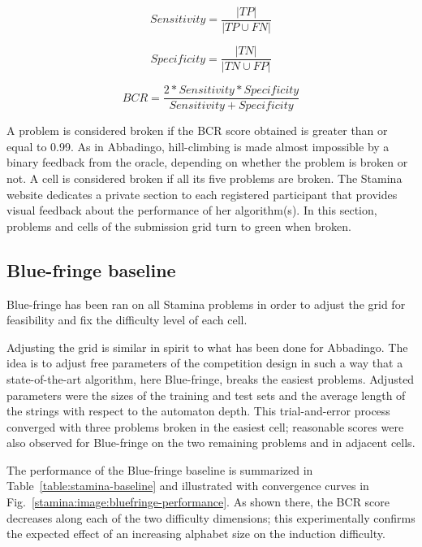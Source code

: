 $$Sensitivity=\frac{|TP|}{|TP \cup FN|}$$ 

$$Specificity=\frac{|TN|}{|TN \cup FP|}$$

$$BCR=\frac{2*Sensitivity*Specificity}{Sensitivity + Specificity}$$

A problem is considered broken if the BCR score obtained is greater than or equal to 0.99. As in Abbadingo, hill-climbing is made almost impossible by a binary feedback from the oracle, depending on whether the problem is broken or not. A cell is considered broken if all its five problems are broken. The Stamina website dedicates a private section to each registered participant that provides visual feedback about the performance of her algorithm(s). In this section, problems and cells of the submission grid turn to green when broken.

\subsection{Blue-fringe baseline\label{subsection:stamina-baseline}}

Blue-fringe has been ran on all Stamina problems in order to adjust the grid for feasibility and fix the difficulty level of each cell.

Adjusting the grid is similar in spirit to what has been done for Abbadingo. The idea is to adjust free parameters of the competition design in such a way that a state-of-the-art algorithm, here Blue-fringe, breaks the easiest problems. Adjusted parameters were the sizes of the training and test sets and the average length of the strings with respect to the automaton depth. This trial-and-error process converged with three problems broken in the easiest cell; reasonable scores were also observed for Blue-fringe on the two remaining problems and in adjacent cells.

The performance of the Blue-fringe baseline is summarized in Table~\ref{table:stamina-baseline} and illustrated with convergence curves in Fig.~\ref{stamina:image:bluefringe-performance}. As shown there, the BCR score decreases along each of the two difficulty dimensions; this experimentally confirms the expected effect of an increasing alphabet size on the induction difficulty. 

